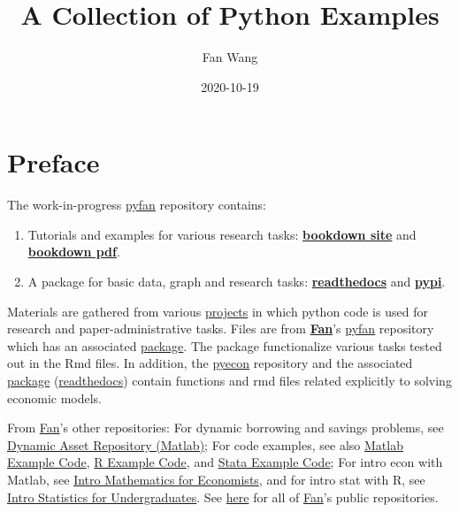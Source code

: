 \documentclass[
]{book}
\title{A Collection of Python Examples}
\author{Fan Wang}
\date{2020-10-19}
\providecommand{\tightlist}{%
  \setlength{\itemsep}{0pt}\setlength{\parskip}{0pt}}
\begin{document}
\maketitle

{
\hypersetup{linkcolor=}
\setcounter{tocdepth}{2}
\tableofcontents
}
\hypertarget{preface}{%
\chapter*{Preface}\label{preface}}

The work-in-progress \href{https://github.com/FanWangEcon/pyfan}{pyfan} repository contains:

\begin{enumerate}
\def\labelenumi{\arabic{enumi}.}
\tightlist
\item
  Tutorials and examples for various research tasks: \href{https://fanwangecon.github.io/pyfan/bookdown}{\textbf{bookdown site}} and \href{https://fanwangecon.github.io/pyfan/bookdown/A-Collection-of-Python-Examples.pdf}{\textbf{bookdown pdf}}.
\item
  A package for basic data, graph and research tasks: \href{https://pyfan.readthedocs.io/en/latest/}{\textbf{readthedocs}} and \href{https://pypi.org/project/pyfan/}{\textbf{pypi}}.
\end{enumerate}

Materials are gathered from various \href{https://fanwangecon.github.io/research}{projects} in which python code is used for research and paper-administrative tasks. Files are from \href{https://fanwangecon.github.io/}{\textbf{Fan}}'s \href{https://github.com/FanWangEcon/pyfan}{pyfan} repository which has an associated \href{https://pypi.org/project/pyfan/}{package}. The package functionalize various tasks tested out in the Rmd files. In addition, the \href{https://github.com/FanWangEcon/pyecon}{pyecon} repository and the associated \href{https://pypi.org/project/pyecon/}{package} (\href{https://pyfan.readthedocs.io/en/latest/autoapi/pyfan/index.html\#module-pyfan}{readthedocs}) contain functions and rmd files related explicitly to solving economic models.

From \href{https://fanwangecon.github.io/}{Fan}'s other repositories: For dynamic borrowing and savings problems, see \href{https://fanwangecon.github.io/CodeDynaAsset/}{Dynamic Asset Repository (Matlab)}; For code examples, see also \href{https://fanwangecon.github.io/M4Econ/}{Matlab Example Code}, \href{https://fanwangecon.github.io/R4Econ/}{R Example Code}, and \href{https://fanwangecon.github.io/Stata4Econ/}{Stata Example Code}; For intro econ with Matlab, see \href{https://fanwangecon.github.io/Math4Econ/}{Intro Mathematics for Economists}, and for intro stat with R, see \href{https://fanwangecon.github.io/Stat4Econ/}{Intro Statistics for Undergraduates}. See \href{https://github.com/FanWangEcon}{here} for all of \href{https://fanwangecon.github.io/}{Fan}'s public repositories.
\end{document}
